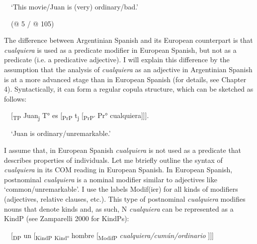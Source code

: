 \begin{styleStandard}
\ \ ‘This movie/Juan is (very) ordinary/bad.’
\end{styleStandard}

\begin{styleStandard}
\ \ (@ 5 / @ 105)
\end{styleStandard}

\begin{styleStandard}
The difference between Argentinian Spanish and its European counterpart is that \textit{cualquiera }is used as a predicate modifier in European Spanish, but not as a predicate (i.e. a predicative adjective). I will explain this difference by the assumption that the analysis of \textit{cualquiera} as an adjective in Argentinian Spanish is at a more advanced stage than in European Spanish (for details, see Chapter 4). Syntactically, it can form a regular copula structure, which can be sketched as follows:
\end{styleStandard}

\begin{styleStandard}
\ \ [\textsubscript{TP} Juan\textsubscript{j} T° es [\textsubscript{PrP} t\textsubscript{j} [\textsubscript{PrP'} Pr° cualquiera]]].
\end{styleStandard}

\begin{styleStandard}
\ \ ‘Juan is ordinary/unremarkable.’
\end{styleStandard}

\begin{styleStandard}
I assume that, in European Spanish \textit{cualquiera} is not used as a predicate that describes properties of individuals. Let me btriefly outline the syntax of \textit{cualquiera} in its COM reading in European Spanish. In European Spanish, postnominal \textit{cualquiera} is a nominal modifier similar to adjectives like ‘common/unremarkable’. I use the labels Modif(ier) for all kinds of modifiers (adjectives, relative clauses, etc.). This type of postnominal \textit{cualquiera} modifies nouns that denote kinds and, as such, N\textit{ cualquiera }can be represented as a KindP (see Zamparelli 2000 for KindPs):
\end{styleStandard}

\begin{styleStandard}
\ \ [\textsubscript{DP} un [\textsubscript{KindP} \textsubscript{Kind°} hombre [\textsubscript{ModifP}\textit{ cualquiera/cumún/ordinario }]]]
\end{styleStandard}


